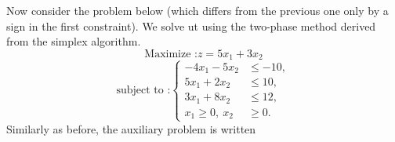 \begin{example}
    Now consider the problem below (which differs from the previous one only by a sign in the first constraint). 
    We solve ut using the two-phase method derived from the simplex algorithm.
    \[
        \text{Maximize :} z = 5x_1 + 3x_2
    \]
    \[
        \text{subject to :}
        \left\{
        \begin{aligned}
        -4x_1 - 5x_2 &\leqslant -10,\\
        5x_1 + 2x_2 &\leqslant 10,\\
        3x_1 + 8x_2 &\leqslant 12,\\
        x_1 \ge 0,\ x_2 &\ge 0.
        \end{aligned}
        \right.
    \]
    Similarly as before, the auxiliary problem is written


\end{example}
